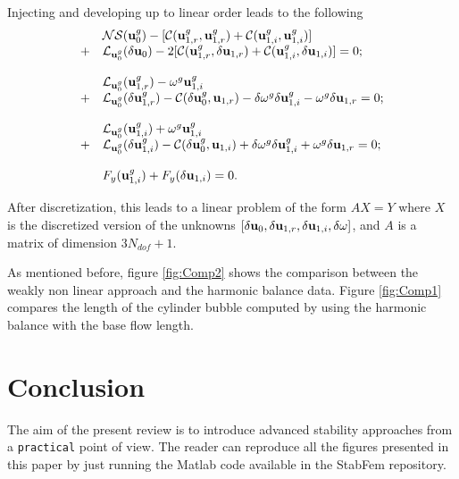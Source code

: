 \documentclass[twocolumn,10pt]{asme2ej}
\begin{document}
Injecting and developing up to linear order leads to the following 
\begin{equation}
\begin{array}{ll}
\displaystyle
& {\cal NS}(  {\bf u }_0^g ) - [ {\cal C}( {\bf u }_{1,r}^g,{\bf u }_{1,r}^g) +  {\cal C}( {\bf u }_{1,i}^g,{\bf u }_{1,i}^g) ]
\\
+& {\cal L}_{{\bf u }_0^g}(\delta {\bf u }_0) - 2 [ {\cal C}( {\bf u }_{1,r}^g,\delta {\bf u }_{1,r}) +  {\cal C}( {\bf u }_{1,i}^g,\delta {\bf u }_{1,i}) ] = 0;
\\
\\
&  {\cal L}_{{\bf u }_0^g}( {\bf u }_{1,r}^g) - \omega^g {\bf u }_{1,i}^g 
 \\
  +& {\cal L}_{{\bf u }_0^g}( \delta {\bf u }_{1,r}^g) 
   -  {\cal C}( \delta {\bf u }_{0}^g, {\bf u }_{1,r})
   - \delta \omega^g \delta {\bf u }_{1,i}^g 
 - \omega^g \delta {\bf u }_{1,r} = 0 ;
 \\
\\
&  {\cal L}_{{\bf u }_0^g}({\bf u }_{1,i}^g) + \omega^g {\bf u }_{1,i}^g
 \\
  +& {\cal L}_{{\bf u }_0^g}( \delta {\bf u }_{1,i}^g) 
  -  {\cal C}( \delta {\bf u }_{0}^g, {\bf u }_{1,i}) 
  + \delta \omega^g \delta {\bf u }_{1,i}^g 
+ \omega^g \delta {\bf u }_{1,r} = 0 ;
\\
\\
& F_y({\bf u }_{1,i}^g) + F_y(\delta {\bf u }_{1,i}) = 0.
 \end{array}
\end{equation}

After discretization, this leads to a linear problem of the form $A X = Y$ where $X$ is the discretized version of the unknowns  $[\delta {\bf u }_0, \delta {\bf u }_{1,r}, \delta {\bf u }_{1,i}, \delta \omega]$, and $A$ is a matrix of dimension $3 N_{dof} +1$. 
 

As mentioned before, figure \ref{fig:Comp2} shows the comparison between the 
weakly non linear approach and the harmonic balance data.  
Figure \ref{fig:Comp1} compares the length of the cylinder bubble computed by using 
the harmonic balance with the base flow length. 




\section{Conclusion}
The aim of the present review is to introduce advanced stability approaches 
from a {\tt practical} point of view. The reader can reproduce all the figures presented 
in this paper by just running the Matlab code available in the StabFem repository. 
\end{document}

